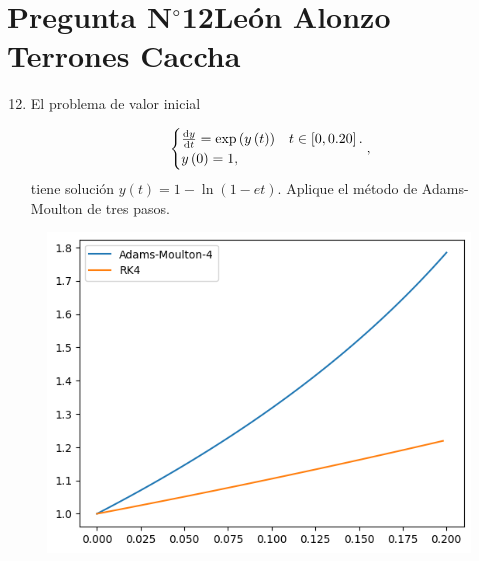 \section{Pregunta N$^{\circ}$12\qquad León Alonzo Terrones Caccha}

\begin{frame}
    \begin{enumerate}\setcounter{enumi}{11}
        \item

              El problema de valor inicial

              \begin{equation*}
                  \begin{cases}
                      \diff{y}{t}=\exp\left(y\left(t\right)\right)
                                         &
                      t\in\left[0,0.20\right]. \\
                      y\left(0\right)=1, &
                  \end{cases},
              \end{equation*}
              tiene solución
              \begin{math}
                  y\left(t\right)=
                  1-\ln\left(1-et\right)
              \end{math}.
              Aplique el método de Adams-Moulton de tres pasos.
    \end{enumerate}

    \begin{solution}
        \begin{figure}[ht!]
            \centering
            \includegraphics[width=.55\paperwidth]{p12-Comparar-results.png}
        \end{figure}
    \end{solution}
\end{frame}

